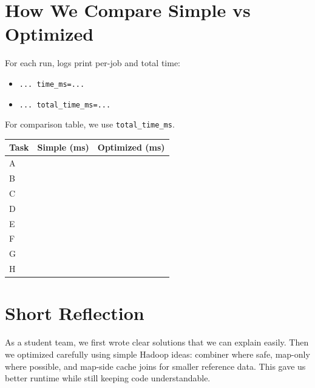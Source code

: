 \documentclass[11pt]{article}
\begin{document}
    \section{How We Compare Simple vs Optimized}
    For each run, logs print per-job and total time:
    \begin{itemize}
        \item \texttt{... time\_ms=...}
        \item \texttt{... total\_time\_ms=...}
    \end{itemize}
    For comparison table, we use \texttt{total\_time\_ms}.

    \begin{longtable}{|l|r|r|}
        \hline
        \textbf{Task} & \textbf{Simple (ms)} & \textbf{Optimized (ms)}\\
        \hline
        A &  & \\
        \hline
        B &  & \\
        \hline
        C &  & \\
        \hline
        D &  & \\
        \hline
        E &  & \\
        \hline
        F &  & \\
        \hline
        G &  & \\
        \hline
        H &  & \\
        \hline
    \end{longtable}

    \section{Short Reflection}
    As a student team, we first wrote clear solutions that we can explain easily.
    Then we optimized carefully using simple Hadoop ideas:
    combiner where safe, map-only where possible, and map-side cache joins for smaller reference data.
    This gave us better runtime while still keeping code understandable.
\end{document}
